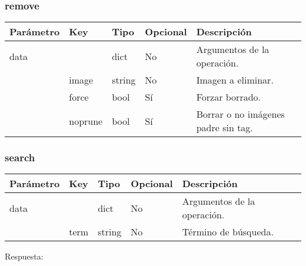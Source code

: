 			\subsubsection{remove}
				\begin{table}[!h]
					\centering
	\begin{adjustbox}{max width=\textwidth}
					\begin{tabular}{|l|l|l|l|l|}
						\hline
						Parámetro & Key & Tipo & Opcional & Descripción \\ \hline
						data &  & dict & No & Argumentos de la operación. \\ \hline
						& image & string & No & Imagen a eliminar. \\ \hline
						& force & bool & Sí & Forzar borrado. \\ \hline
						& noprune & bool & Sí & Borrar o no imágenes padre sin tag. \\ \hline
					\end{tabular}
\end{adjustbox}
				\end{table}
			
			\subsubsection{search}
				\begin{table}[!h]
					\centering
	\begin{adjustbox}{max width=\textwidth}
					\begin{tabular}{|l|l|l|l|l|}
						\hline
						Parámetro & Key & Tipo & Opcional & Descripción \\ \hline
						data &  & dict & No & Argumentos de la operación. \\ \hline
						& term & string & No & Término de búsqueda. \\ \hline
					\end{tabular}
\end{adjustbox}
				\end{table}
			
				Respuesta:
				
